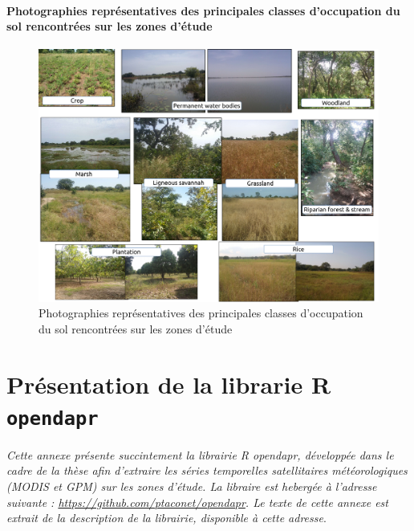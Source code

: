 \documentclass[12pt,twoside]{reedthesis}
\begin{document}
\hypertarget{photographies-repruxe9sentatives-des-principales-classes-doccupation-du-sol-rencontruxe9es-sur-les-zones-duxe9tude}{%
\subsubsection{Photographies représentatives des principales classes d'occupation du sol rencontrées sur les zones d'étude}\label{photographies-repruxe9sentatives-des-principales-classes-doccupation-du-sol-rencontruxe9es-sur-les-zones-duxe9tude}}
\begin{figure}

{\centering \includegraphics[width=1\linewidth]{figure/pictures_landcover} 

}

\caption[Photos représentatives des principales classes d'occupation du sol rencontrées sur les zones d'étude]{Photographies représentatives des principales classes d'occupation du sol rencontrées sur les zones d'étude}\label{fig:pictures-lc}
\end{figure}
\hypertarget{annex-opendapr}{%
\chapter{\texorpdfstring{Présentation de la librarie R \texttt{opendapr}}{Présentation de la librarie R opendapr}}\label{annex-opendapr}}

\emph{Cette annexe présente succintement la librairie R opendapr, développée dans le cadre de la thèse afin d'extraire les séries temporelles satellitaires météorologiques (MODIS et GPM) sur les zones d'étude. La libraire est hebergée à l'adresse suivante : \url{https://github.com/ptaconet/opendapr}. Le texte de cette annexe est extrait de la description de la librairie, disponible à cette adresse}.\\
\end{document}
